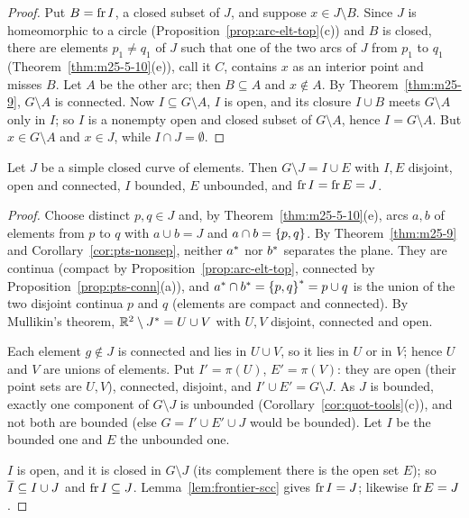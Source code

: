 \begin{proof}
Put $B=\operatorname{fr} I$, a closed subset of $J$, and suppose $x\in J\setminus B$. Since $J$ is homeomorphic to
a circle (Proposition~\ref{prop:arc-elt-top}(c)) and $B$ is closed, there are elements $p_1\ne q_1$ of
$J$ such that one of the two arcs of $J$ from $p_1$ to $q_1$ (Theorem~\ref{thm:m25-5-10}(e)), call it
$C$, contains $x$ as an interior point and misses $B$. Let $A$ be the other arc; then $B\subseteq A$ and
$x\notin A$. By Theorem~\ref{thm:m25-9}, $G\setminus A$ is connected. Now $I\subseteq G\setminus A$, $I$
is open, and its closure $I\cup B$ meets $G\setminus A$ only in $I$; so $I$ is a nonempty open and
closed subset of $G\setminus A$, hence $I=G\setminus A$. But $x\in G\setminus A$ and $x\in J$, while
$I\cap J=\emptyset$.
\end{proof}


\begin{theorem}\label{thm:m25-11}
Let $J$ be a simple closed curve of elements. Then $G\setminus J=I\cup E$ with $I,E$ disjoint,
open and connected, $I$ bounded, $E$ unbounded, and $\operatorname{fr} I=\operatorname{fr} E=J$.
\end{theorem}

\begin{proof}
Choose distinct $p,q\in J$ and, by Theorem~\ref{thm:m25-5-10}(e), arcs $a,b$ of elements from $p$
to $q$ with $a\cup b=J$ and $a\cap b=\left\{ p,q \right\}$. By Theorem~\ref{thm:m25-9} and
Corollary~\ref{cor:pts-nonsep}, neither $a^{\ast}$ nor $b^{\ast}$ separates the plane. They are continua
(compact by Proposition~\ref{prop:arc-elt-top}, connected by Proposition~\ref{prop:pts-conn}(a)), and
$a^{\ast}\cap b^{\ast}=\left\{ p,q \right\}^{\ast}=p\cup q$ is the union of the two disjoint continua $p$ and $q$
(elements are compact and connected). By Mullikin's theorem, $\mathbb{R}^2\setminus J^{\ast}=U\cup V$ with
$U,V$ disjoint, connected and open.

Each element $g\notin J$ is connected and lies in $U\cup V$, so it lies in $U$ or in $V$; hence $U$
and $V$ are unions of elements. Put $I'=\pi(U)$, $E'=\pi(V)$: they are open (their point sets are $U,V$),
connected, disjoint, and $I'\cup E'=G\setminus J$. As $J$ is bounded, exactly one component of
$G\setminus J$ is unbounded (Corollary~\ref{cor:quot-tools}(c)), and not both are bounded (else $G=I'\cup
E'\cup J$ would be bounded). Let $I$ be the bounded one and $E$ the unbounded one.

$I$ is open, and it is closed in $G\setminus J$ (its complement there is the open set $E$); so $\overline{I}\subseteq I\cup J$ and $\operatorname{fr} I\subseteq J$. Lemma~\ref{lem:frontier-scc} gives $\operatorname{fr} I=J$; likewise $\operatorname{fr}
E=J$.
\end{proof}

